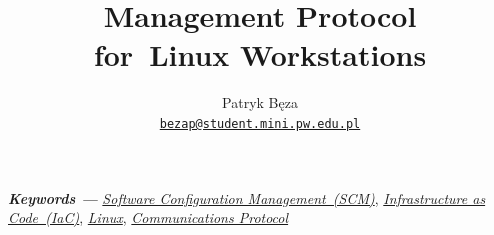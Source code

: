 \documentclass[12pt,a4paper]{article}
\begin{document}

\thispagestyle{empty}
\title{\textbf{Management Protocol\\for~Linux Workstations}}
\author{Patryk Bęza\\[-8pt]
\small \texttt{\href{mailto:bezap@student.mini.pw.edu.pl}{bezap@student.mini.pw.edu.pl}}%
}
\date{}

\maketitle
\providecommand{\keywords}[1]{\textbf{\textit{Keywords ---}} #1}
\keywords{\emph{\href{https://en.wikipedia.org/wiki/Software_configuration_management}{Software Configuration Management~(SCM)}}, \emph{\href{https://en.wikipedia.org/wiki/Infrastructure_as_Code}{Infrastructure as Code~(IaC)}}, \emph{\href{https://en.wikipedia.org/wiki/Linux}{Linux}}, \emph{\href{https://en.wikipedia.org/wiki/Communications_protocol}{Communications Protocol}}}
\global\let\newpage\newpagegood
\thispagestyle{empty}
\end{document}
